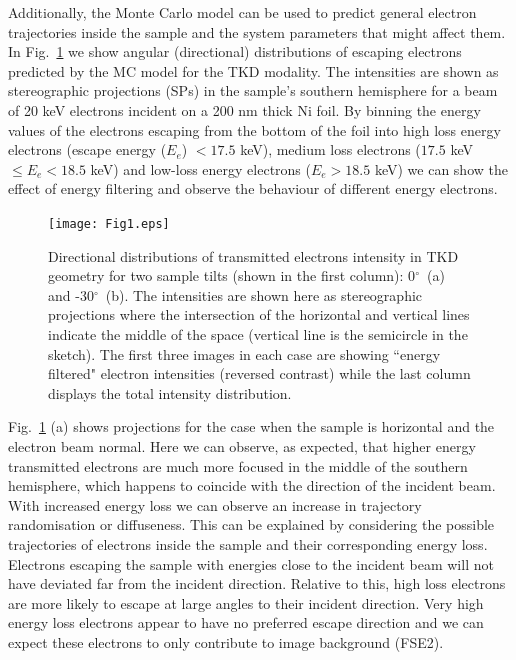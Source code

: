 Additionally, the Monte Carlo model can be used to predict general electron trajectories inside the sample and the system parameters that might affect them. In Fig.~\ref{fig:SP_TKD} we show angular (directional) distributions of escaping electrons predicted by the MC model for the TKD modality. The intensities are shown as stereographic projections (SPs) in the sample's southern hemisphere for a beam of 20 keV electrons incident on a 200 nm thick Ni foil. By binning the energy values of the electrons escaping from the bottom of the foil into high loss energy electrons (escape energy ($E_e$) $<17.5$ keV), medium loss electrons ($17.5$ keV $\leqslant E_e < 18.5$ keV) and low-loss energy electrons ($E_e>18.5$ keV) we can show the effect of energy filtering and observe the behaviour of different energy electrons. 



\begin{figure}[t]
\centering\leavevmode
\texttt{[image: Fig1.eps]} %
\caption{Directional distributions of transmitted electrons intensity in TKD geometry for two sample tilts (shown in the first column): 0$^{\circ}$~(a) and -30$^{\circ}$~(b). The intensities are shown here as stereographic projections where the intersection of the horizontal and vertical lines indicate the middle of the space (vertical line is the semicircle in the sketch). The first three images in each case are showing  ``energy filtered" electron intensities (reversed contrast) while the last column displays the total intensity distribution. } 
\label{fig:SP_TKD}
\end{figure}


Fig.~\ref{fig:SP_TKD} (a) shows projections for the case when the sample is horizontal and the electron beam normal. Here we can observe, as expected, that higher energy transmitted electrons are much more focused in the middle of the southern hemisphere, which happens to coincide with the direction of the incident beam. With increased energy loss we can observe an increase in trajectory randomisation or diffuseness. This can be explained by considering the possible trajectories of electrons inside the sample and their corresponding energy loss. Electrons escaping the sample with energies close to the incident beam will not have deviated far from the incident direction. Relative to this, high loss electrons are more likely to escape at large angles to their incident direction. Very high energy loss electrons appear to have no preferred escape direction and we can expect these electrons to only contribute to image background (FSE2). 

